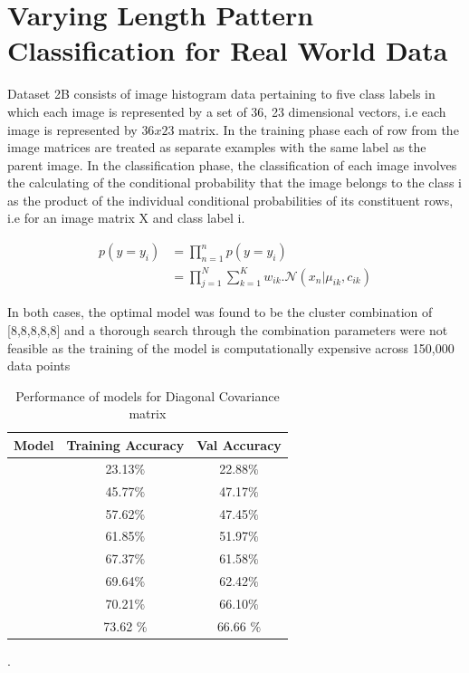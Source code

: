 \section{Varying Length Pattern Classification for Real World Data}


Dataset 2B consists of image histogram data pertaining to five class labels in which each image is represented by a set of 36, 23 dimensional vectors, i.e each image is represented by $36x23$ matrix. In the training phase each of row from the image matrices are treated as separate examples with the
same label as the parent image. In the classification phase, the classification of each image involves the calculating of the conditional probability that the image belongs to the class i as the product of the individual conditional probabilities of its constituent rows, i.e for an image matrix X and class label i.

 \begin{align*}
      p(y=y_i) &= \prod_{n=1}^{n} p(y=y_i) \\
                    &= \prod_{j=1}^{N}\sum_{k=1}^{K}w_{ik}. \mathcal{N}(x_n|\mu_{ik},c_{ik})
  \end{align*}
  

In both cases, the optimal model was found to be the cluster combination of [8,8,8,8,8] and a thorough search through the combination parameters were not feasible as the training of the model is computationally expensive across 150,000 data points

{
\begin{table}[!h]
\centering
\begin{tabular}{ |c|c|c|  }
\hline
\rowcolor{lightgray} Model & Training Accuracy & Val Accuracy \\
\hline
[1,1,1,1,1] & 23.13$\%$  & 22.88$\%$ \\   
 \hline
[2,2,2,2,2] & 45.77$\%$  & 47.17$\%$ \\ 
\hline
[3,3,3,3,3] & 57.62$\%$  & 47.45$\%$ \\
\hline
[4,4,4,4,4] & 61.85$\%$  & 51.97$\%$ \\
\hline
[5,5,5,5,5] & 67.37$\%$  & 61.58$\%$ \\
\hline
[6,6,6,6,6] & 69.64$\%$  & 62.42$\%$ \\
\hline
[7,7,7,7,7] & 70.21$\%$  & 66.10$\%$ \\
\hline
[8,8,8,8,8]  & 73.62 $\%$  & 66.66 $\%$ \\
\hline
\end{tabular}
\caption{Performance of models for Diagonal Covariance matrix}.
\label{table:9}
\end{table}
}

